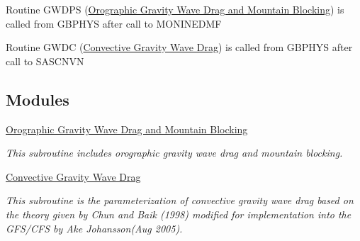 \begin{DoxyItemize}
\item Routine G\+W\+D\+PS (\hyperlink{group__orographic}{Orographic Gravity Wave Drag and Mountain Blocking}) is called from G\+B\+P\+H\+YS after call to M\+O\+N\+I\+N\+E\+D\+MF
\item Routine G\+W\+DC (\hyperlink{group__convective}{Convective Gravity Wave Drag}) is called from G\+B\+P\+H\+YS after call to S\+A\+S\+C\+N\+VN 
\end{DoxyItemize}\subsection*{Modules}
\begin{DoxyCompactItemize}
\item 
\hyperlink{group__orographic}{Orographic Gravity Wave Drag and Mountain Blocking}
\begin{DoxyCompactList}\small\item\em This subroutine includes orographic gravity wave drag and mountain blocking. \end{DoxyCompactList}\item 
\hyperlink{group__convective}{Convective Gravity Wave Drag}
\begin{DoxyCompactList}\small\item\em This subroutine is the parameterization of convective gravity wave drag based on the theory given by Chun and Baik (1998) \cite{chun_and_baik_1998} modified for implementation into the G\+F\+S/\+C\+FS by Ake Johansson(\+Aug 2005). \end{DoxyCompactList}\end{DoxyCompactItemize}
